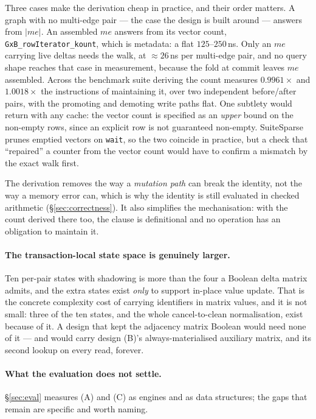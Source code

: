 \documentclass[11pt,a4paper]{article}
\theoremstyle{plain}
\theoremstyle{definition}
\theoremstyle{remark}
\begin{document}
Three cases make the derivation cheap in practice, and their order matters. A
graph with no multi-edge pair --- the case the design is built around ---
answers from $|me|$. An assembled $me$ answers from its vector count,
\texttt{GxB\_rowIterator\_kount}, which is metadata: a flat $125$--$250$\,ns.
Only an $me$ carrying live deltas needs the walk, at $\approx\!26$\,ns per
multi-edge pair, and no query shape reaches that case in measurement, because
the fold at commit leaves $me$ assembled. Across the benchmark suite deriving
the count measures $0.9961\times$ and $1.0018\times$ the instructions of
maintaining it, over two independent before/after pairs, with the promoting and
demoting write paths flat. One subtlety would return with any cache: the vector
count is specified as an \emph{upper} bound on the non-empty rows, since an
explicit row is not guaranteed non-empty. SuiteSparse prunes emptied vectors on
\texttt{wait}, so the two coincide in practice, but a check that ``repaired'' a
counter from the vector count would have to confirm a mismatch by the exact
walk first.

The derivation removes the way a \emph{mutation path} can break the identity,
not the way a memory error can, which is why the identity is still evaluated
in checked arithmetic (\S\ref{sec:correctness}). It also simplifies the
mechanisation: with the count derived there too, the clause is definitional and
no operation has an obligation to maintain it.

\paragraph{The transaction-local state space is genuinely larger.}
Ten per-pair states with shadowing is more than the four a Boolean delta
matrix admits, and the extra states exist \emph{only} to support in-place
value update. That is the concrete complexity cost of carrying identifiers in
matrix values, and it is not small: three of the ten states, and the whole
cancel-to-clean normalisation, exist because of it. A design that kept the
adjacency matrix Boolean would need none of it --- and would carry design
(B)'s always-materialised auxiliary matrix, and its second lookup on every
read, forever.

\paragraph{What the evaluation does not settle.}
\S\ref{sec:eval} measures (A) and (C) as engines and as data structures; the
gaps that remain are specific and worth naming.
\end{document}
